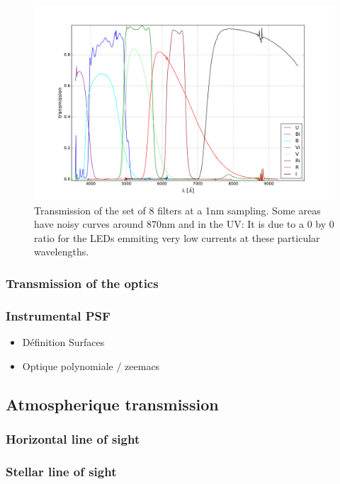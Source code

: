 \documentclass[\docopts]{\docclass}
\begin{document}
\begin{figure}[ht]
  \centering
  \includegraphics[width=0.7\linewidth]{filters_transmissions.pdf}
  \caption{Transmission of the set of 8 filters at a 1nm
    sampling. Some areas have noisy curves around 870nm and in the UV:
    It is due to a 0 by 0 ratio for the LEDs emmiting very low
    currents at these particular wavelengths.}
  \label{fig:filters_transmissions}
\end{figure}


\subsubsection{Transmission of the optics}
\label{sec:optics}

\subsubsection{Instrumental PSF}
\label{sec:PSF}
\begin{itemize}
\item Définition Surfaces
\item Optique polynomiale / zeemacs
\end{itemize}



\subsection{Atmospherique transmission}
\label{sec:atmosphere}

\subsubsection{Horizontal line of sight}
\label{sec:hline}


\subsubsection{Stellar line of sight}
\label{sec:av}
\end{document}
